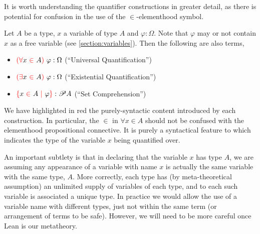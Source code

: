 \documentclass[12pt,leqno]{article}
\theoremstyle{example}
\numberwithin{equation}{section}
\begin{document}
It is worth understanding the quantifier constructions in greater detail, as there is potential for confusion in the use of the $\in$-elementhood symbol.

Let $A$ be a type, $x$ a variable of type $A$ and $\varphi : \Omega$. Note that $\varphi$ may or not contain $x$ as a free variable (see \ref{section:variables}). Then the following are also terms,
\begin{itemize}
  \item ${\color{red}(\forall } x~ { \color{red} \in~ }  A {\color{red})}~\varphi : \Omega$ (``Universal Quantification'')
  \item ${\color{red}(\exists }x~ {\color{red} \in~} A{\color{red})}~\varphi : \Omega$ (``Existential Quantification'')
  \item ${\color{red}\{}x~ {\color{red}\in}~ A~ {\color{red}\mid}~  \varphi {\color{red}\}} : \mathscr{P} A$ (``Set Comprehension'')
\end{itemize}
We have highlighted in red the purely-syntactic content introduced by each construction. In particular, the $\in$ in $\forall x \in A$ should not be confused with the elementhood propositional connective. It is purely a syntactical feature to which indicates the type of the variable $x$ being quantified over.

An important subtlety is that in declaring that the variable $x$ has type $A$, we are assuming any appearance of a variable with name $x$ is actually the same variable with the same type, $A$. More correctly, each type has (by meta-theoretical assumption) an unlimited supply of variables of each type, and to each such variable is associated a unique type. In practice we would allow the use of a variable name with different types, just not within the same term (or arrangement of terms to be safe). However, we will need to be more careful once Lean is our metatheory.
\end{document}
